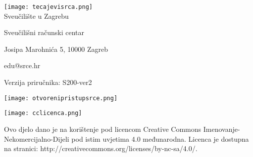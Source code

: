 \begin{centering}

  \texttt{[image: tecajevisrca.png]}\\[\bigskipamount]

\normalsize Sveučilište u Zagrebu

\normalsize Sveučilišni računski centar

\normalsize Josipa Marohnića 5, 10000 Zagreb

\normalsize edu@srce.hr


\vspace{6 cm}


\normalsize Verzija priručnika: S200-ver2
\vspace{3 cm}

 \texttt{[image: otvorenipristupsrce.png]}\\[\bigskipamount]




\begin{multicols}{2}
\begin{flushright}
    \texttt{[image: cclicenca.png]}
\end{flushright}
\columnbreak
\begin{flushleft}
\normalsize  Ovo djelo dano je na korištenje pod licencom Creative Commons Imenovanje-Nekomercijalno-Dijeli pod istim uvjetima 4.0 međunarodna. Licenca je dostupna na stranici: http://creativecommons.org/licenses/by-nc-sa/4.0/.
\end{flushleft}
\end{multicols}

\end{centering}


\newpage
\pagestyle{fancy}




























